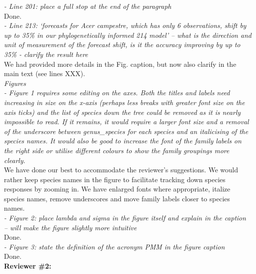 \documentclass[11pt]{article}
\begin{document}
\emph{- Line 201: place a full stop at the end of the paragraph}\\
Done.\\

\emph{- Line 213: ‘forecasts for Acer campestre, which has only 6 observations, shift by up to 35\% in our phylogenetically informed 214 model’ – what is the direction and unit of measurement of the forecast shift, is it the accuracy improving by up to 35\% - clarify the result here}\\
We had provided more details in the Fig. caption, but now also clarify in the main text (see lines XXX).\\


\emph{Figures}\\
\emph{- Figure 1 requires some editing on the axes. Both the titles and labels need increasing in size on the x-axis (perhaps less breaks with greater font size on the axis ticks) and the list of species down the tree could be removed as it is nearly impossible to read. If it remains, it would require a larger font size and a removal of the underscore between genus\_species for each species and an italicising of the species names. It would also be good to increase the font of the family labels on the right side or utilise different colours to show the family groupings more clearly.}\\
We have done our best to accommodate the reviewer's suggestions. We would rather keep species names in the figure to facilitate tracking down species responses by zooming in. We have enlarged fonts where appropriate, italize species names, remove underscores and move family labels closer to species names.\\

\emph{- Figure 2: place lambda and sigma in the figure itself and explain in the caption – will make the figure slightly more intuitive}\\
Done.\\

\emph{- Figure 3: state the definition of the acronym PMM in the figure caption}\\
Done.\\

{\bf Reviewer \#2:}\\
\end{document}
